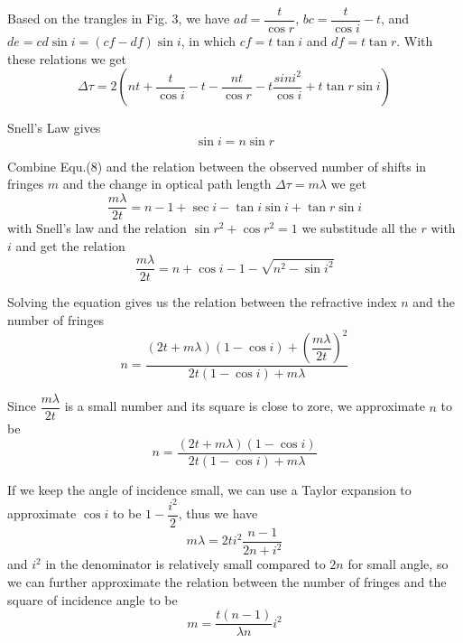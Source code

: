 \documentclass{article}
\begin{document}
Based on the trangles in Fig. 3, we have $ ad=\dfrac{t}{\cos{r}} $, $ bc= \dfrac{t}{\cos{i}}-t$, and $ de=cd\sin{i}=(cf-df)\sin{i}$, in which $cf=t\tan{i}$ and $df=t\tan{r}$. With these relations we get
\begin{equation}
	\Delta{\tau}=2(n{t}+\dfrac{t}{\cos{i}}-t-\dfrac{nt}{\cos{r}}-t\dfrac{sin{i}^{2}}{\cos{i}}+t\tan{r}\sin{i})
\end{equation}



Snell's Law gives
\begin{equation}
	\sin{i}=n\sin{r}
\end{equation}

Combine Equ.(8) and the relation between the observed number of shifts in fringes $m$ and the change in optical path length $\Delta{\tau}=m\lambda$ we get
\begin{equation}
\dfrac{m\lambda}{2t}=n-1+\sec{i}-\tan{i}\sin{i}+\tan{r}\sin{i}
\end{equation}
with Snell's law and the relation $\sin{r}^{2}+\cos{r}^{2}=1$ we substitude all the $r$ with $i$ and get the relation 
\begin{equation}
\dfrac{m\lambda}{2t}=n+\cos{i}-1-\sqrt{n^{2}-\sin{i}^{2}}
\end{equation}

Solving the equation gives us the relation between the refractive index $n$ and the number of fringes
\begin{equation}
	n=\dfrac{(2t+m\lambda)(1-\cos{i})+(\dfrac{m\lambda}{2t})^{2}}{2t(1-\cos{i})+m\lambda}
\end{equation}

Since $\dfrac{m\lambda}{2t}$ is a small number and its square is close to zore, we approximate $n$ to be 
\begin{equation}
n=\dfrac{(2t+m\lambda)(1-\cos{i})}{2t(1-\cos{i})+m\lambda}
\end{equation}

If we keep the angle of incidence small, we can use a Taylor expansion to approximate $\cos{i}$ to be $1-\dfrac{i^{2}}{2}$, thus we have
\begin{equation}
	m\lambda=2ti^{2}\dfrac{n-1}{2n+i^{2}}
\end{equation}
and $i^{2}$ in the denominator is relatively small compared to $2n$ for small angle, so we can further approximate the relation between the number of fringes and the square of incidence angle to be
\begin{equation}
	m=\dfrac{t(n-1)}{\lambda{n}}i^{2}
\end{equation} 
\end{document}
